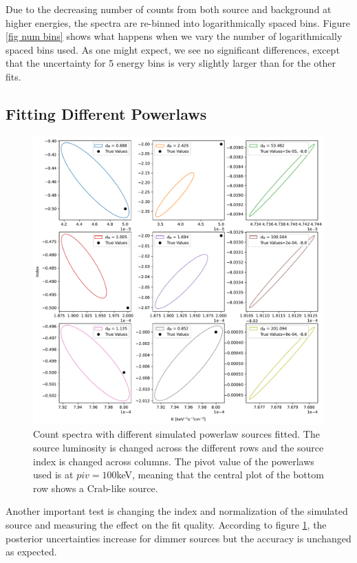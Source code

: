 \documentclass{report}
\begin{document}
Due to the decreasing number of counts from both source and background at higher energies, the spectra are re-binned into logarithmically spaced bins. Figure \ref{fig num bins} shows what happens when we vary the number of logarithmically spaced bins used. As one might expect, we see no significant differences, except that the uncertainty for 5 energy bins is very slightly larger than for the other fits.


\subsection{Fitting Different Powerlaws}

\begin{figure}[h]
  \centering
  \includegraphics[width=\textwidth]{Images/Pure_Simulation/combined_plots_different_sources.pdf}
  \caption{Count spectra with different simulated powerlaw sources fitted. The source luminosity is changed across the different rows and the source index is changed across columns. The pivot value of the powerlaws used is at $piv=100$keV, meaning that the central plot of the bottom row shows a Crab-like source.}
  \label{fig diff powerlaws}
\end{figure}

Another important test is changing the index and normalization of the simulated source and measuring the effect on the fit quality.  According to figure \ref{fig diff powerlaws}, the posterior uncertainties increase for dimmer sources but the accuracy is unchanged as expected. 
\end{document}
